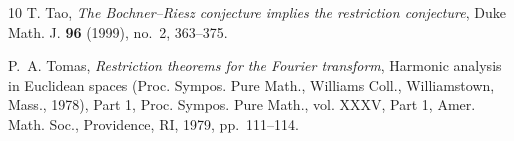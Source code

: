 \documentclass[leqno]{amsart}
\theoremstyle{definition}
\theoremstyle{remark}
\numberwithin{equation}{section}
\begin{document}
\begin{thebibliography}{10}
T. Tao, \emph{The {B}ochner--{R}iesz conjecture implies the restriction
  conjecture}, Duke Math. J. \textbf{96} (1999), no.~2, 363--375.
  
P.~A. Tomas, \emph{Restriction theorems for the {F}ourier transform},
  Harmonic analysis in {E}uclidean spaces ({P}roc. {S}ympos. {P}ure
  {M}ath., {W}illiams {C}oll., {W}illiamstown, {M}ass., 1978), {P}art 1,
  Proc. Sympos. Pure Math., vol. XXXV, Part 1, Amer. Math. Soc.,
  Providence, RI, 1979, pp.~111--114. 

\end{thebibliography}


\end{document}

